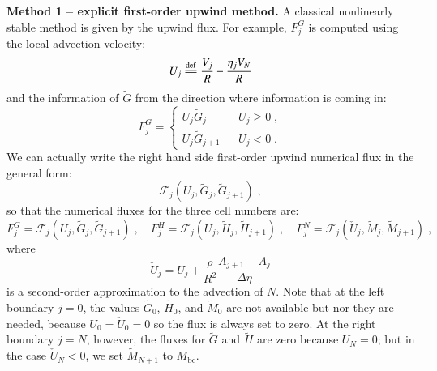 \documentclass{amsart}
\theoremstyle{definition}
\theoremstyle{remark}
\numberwithin{equation}{section}
\numberwithin{figure}{section}
\newcommand{\eqdef}{\stackrel{\mathrm{def}}{=\joinrel=}}
\begin{document}
\noindent
{\bf Method 1 -- explicit first-order upwind method.}
A classical nonlinearly stable method is given by the upwind flux.
For example, $F_j^G$ is computed using the local advection velocity:
\begin{equation}\label{eq:num_adv_u_gh}
U_j \eqdef \frac{V_j}{R}-\frac{\eta_jV_N}{R}
\end{equation}
and the information of $\tilde{G}$ from the direction where information is coming in:
\begin{equation}\label{eq:num_flux_upw_g}
F_j^G = \left\{\begin{array}{lcl}
U_j\tilde{G}_j & & U_j\ge0\;,\\
U_j\tilde{G}_{j+1} & & U_j<0\;.
\end{array}\right.
\end{equation}
We can actually write the right hand side first-order upwind numerical flux in the general form:
\begin{equation}\label{eq:num_flux_upw}
\mathcal{F}_j(U_j,\tilde{G}_j,\tilde{G}_{j+1})\;,
\end{equation}
so that the numerical fluxes for the three cell numbers are:
\begin{displaymath}
F_j^G = \mathcal{F}_j(U_j,\tilde{G}_j,\tilde{G}_{j+1})\;,\quad
F_j^H = \mathcal{F}_j(U_j,\tilde{H}_j,\tilde{H}_{j+1})\;,\quad
F_j^N = \mathcal{F}_j(\check{U}_j,\tilde{M}_j,\tilde{M}_{j+1})\;,
\end{displaymath}
where
\begin{equation}\label{eq:num_adv_u_n}
\check{U}_j = U_j + \frac{\rho}{R^2}\frac{A_{j+1}-A_j}{\Delta\eta}
\end{equation}
is a second-order approximation to the advection of $N$.
Note that at the left boundary $j=0$, the values $\tilde{G}_0$, $\tilde{H}_0$, and $\tilde{M}_0$ are not available but nor they are needed, because $U_0=\check{U}_0=0$ so the flux is always set to zero.
At the right boundary $j=N$, however, the fluxes for $\tilde{G}$ and $\tilde{H}$ are zero because $U_N=0$; but in the case $\check{U}_N<0$, we set $\tilde{M}_{N+1}$ to $M_{\textrm{bc}}$.
\end{document}
